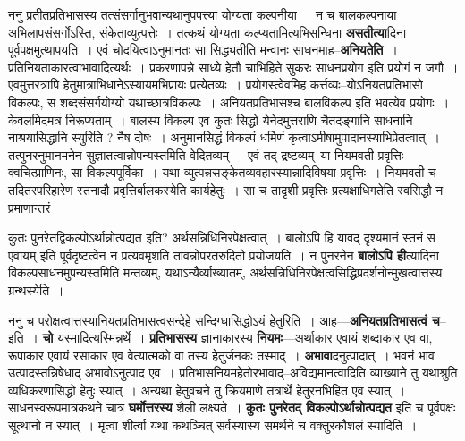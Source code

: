 \documentclass[article,12pt,a4paper]{memoir}
\begin{document}
	  \pstart ननु प्रतीतप्रतिभासस्य तत्संसर्गानुभवान्यथानुपपत्त्या योग्यता कल्पनीया । न च बालकल्पनाया अभिलापसंसर्गोऽस्ति, संकेताव्युत्पत्तेः । तत्कथं योग्यता कल्प्यतामित्यभिसन्धिना \textbf{असतीत्या}दिना पूर्वपक्षमुत्थापयति । एवं चोदयित्वाऽनुमानतः सा सिद्ध्यतीति मन्वानः साधनमाह--\textbf{अनियतेति} । प्रतिनियताकारत्वाभावादित्यर्थः । प्रकरणापन्ने साध्ये हेतौ चाभिहिते सुकरः साधनप्रयोग इति प्रयोगं न जगौ । एवमुत्तरत्रापि हेतुमात्राभिधानेऽस्यायमभिप्रायः प्रत्येतव्यः । प्रयोगस्त्वेवमिह कर्त्तव्यः--योऽनियतप्रतिभासो विकल्पः, स शब्दसंसर्गयोग्यो यथाच्छात्रविकल्पः । अनियतप्रतिभासश्च बालविकल्प इति भवत्येव प्रयोगः । केवलमिदमत्र निरूप्यताम् । बालस्य विकल्प एव कुतः सिद्धो येनेदमुत्तराणि चैतदङ्गानि साधनानि ना\leavevmode{}श्रयासिद्धानि स्युरिति ? नैष दोषः । अनुमानसिद्धं विकल्पं धर्मिणं कृत्वाऽमीषामुपादानस्याभिप्रेतत्वात् । तत्पुनरनुमानमनेन सुज्ञातत्वान्नोपन्यस्तमिति वेदितव्यम् । एवं तद् द्रष्टव्यम्--या नियमवती प्रवृत्तिः क्वचित्प्राणिनः, सा विकल्पपूर्विका । यथा व्युत्पन्नसङ्केतव्यवहारस्यान्नादिविषया प्रवृत्तिः । नियमवती च तदितरपरिहारेण स्तनादौ प्रवृत्तिर्बालकस्येति कार्यहेतुः । सा च तादृशी प्रवृत्तिः प्रत्यक्षाधिगतेति स्वसिद्धौ न प्रमाणान्तरं  \leavevmode{} 
	  
	कुतः पुनरेतद्विकल्पोऽर्थान्नोत्पद्यत इति? अर्थसन्निधिनिरपेक्षत्वात् । बालोऽपि हि यावद् दृश्यमानं स्तनं स एवायम् इति पूर्वदृष्टत्वेन न प्रत्यवमृशति तावन्नोपरतरुदितो प्रयोजयति । न पुनरनेन \textbf{बालोऽपि ही}त्यादिना विकल्पसाधनमुपन्यस्तमिति मन्तव्यम्, यथाऽन्यैर्व्याख्यातम्, अर्थसन्निधिनिरपेक्षत्वसिद्धिप्रदर्शनोन्मुखत्वात्तस्य ग्रन्थस्येति ।
	\pend
      

	  \pstart ननु च परोक्षत्वात्तस्यानियतप्रतिभासत्वसन्देहे सन्दिग्धासिद्धोऽयं हेतुरिति । आह—\textbf{अनियतप्रतिभासत्वं च}--इति । \textbf{चो} यस्मादित्यस्मिन्नर्थे । \textbf{प्रतिभासस्य} ज्ञानाकारस्य \textbf{नियमः}—अर्थाकार एवायं शब्दाकार एव वा, रूपाकार एवायं रसाकार एव वेत्यात्मको वा तस्य हेतुर्जनकः तस्माद् । \textbf{अभावा}दनुत्पादात् । भवनं भाव उत्पादस्तन्निषेधाद् अभावोऽनुत्पाद एव । प्रतिभासनियमहेतोरभावाद्--अविद्यमानत्वादिति व्याख्याने तु यथाश्रुति व्यधिकरणासिद्धो हेतुः स्यात् । अन्यथा हेतुवचने तु क्रियमाणे तत्रार्थे हेतुरनभिहित एव स्यात् । साधनस्वरूपमात्रकथने चात्र \textbf{घर्मोत्तरस्य} शैली लक्ष्यते । \textbf{कुतः पुनरेतद् विकल्पोऽर्थान्नोत्पद्यत} इति च पूर्वपक्षः सूत्थानो न स्यात् । मृत्वा शीर्त्वा यथा कथञ्चित् सर्वस्यास्य समर्थने च वक्तुरकौशलं स्यादिति ।
	\pend
      
\end{document}
